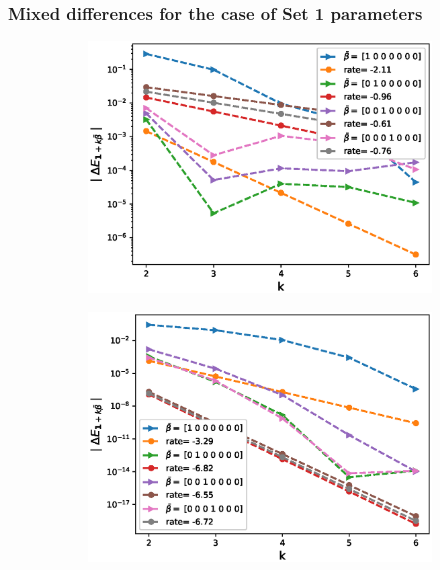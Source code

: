 \documentclass[11pt]{article}
\begin{document}
 \subsubsection*{Mixed differences for the case of Set 1 parameters}
\FloatBarrier
\begin{figure}[htb]
	\centering %
	\begin{subfigure}{0.33\textwidth}
		\includegraphics[width=\linewidth]{./figures/Heston_single_call_full_truncation_vol/mixed_rates/set2/N_4/first_difference_heston_4steps_hierarchical_2}
		\caption{}
		\label{fig:1}
	\end{subfigure}\hfil %
	\begin{subfigure}{0.33\textwidth}
		\includegraphics[width=\linewidth]{./figures/Heston_single_call_ABR_moment_matching/mixed_rates/set2/N_4/first_difference_heston_4steps_hierarchical}

\end{subfigure}
\end{figure}
\end{document}
